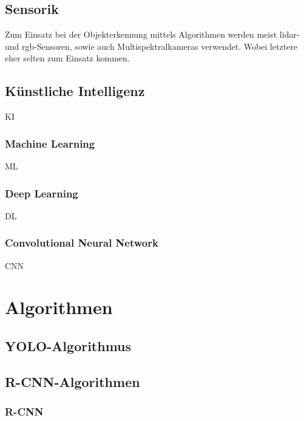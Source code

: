 \documentclass[12pt,
titlepage,
a4paper,
oneside,     %
openany,     %
listof=totoc,  %
numbers = noenddot, %
bibliography=totoc,    %
headsepline, %
]{scrbook} %
\begin{document}
\section{Sensorik}
\label{sec_sensorik}

Zum Einsatz bei der Objekterkennung mittels Algorithmen werden meist \ac{lidar}- und \ac{rgb}-Sensoren, sowie auch Multispektralkameras verwendet. Wobei letztere eher selten zum Einsatz kommen.

\section{Künstliche Intelligenz}
\label{sec_ki}

KI

\subsection{Machine Learning}
\label{subsec_machine}

ML

\subsection{Deep Learning}
\label{subsec_deep}

DL

\subsection{Convolutional Neural Network}
\label{subsec_cnn}

CNN

\chapter{Algorithmen}
\label{cha:algorithmen}



\section{YOLO-Algorithmus}
\label{sec_yolo}



\section{R-CNN-Algorithmen}
\label{sec_rcnnalg}



\subsection{R-CNN}
\label{subsec_rcnn}
\end{document}
